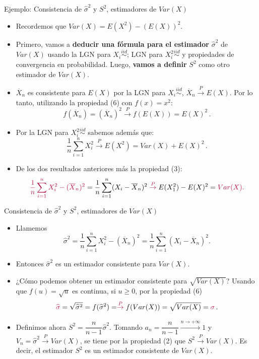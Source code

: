 \documentclass{beamer}
\theoremstyle{definition}
\newcommand{\cp}{\overset{P}{\rightarrow}}
\begin{document}
\begin{frame}{\color{rosee}Ejemplo: Consistencia de $\widehat{\sigma}^2$ y $S^2$, estimadores de $Var(X)$}\small
  
  \begin{itemize}
  \item  Recordemos que $Var(X)=E(X^{2})-\left( E(X)\right)^{2}$.
  \item Primero, vamos a \textbf{deducir una fórmula para el estimador} $\widehat{\sigma}^2$ de $Var(X)$ usando la LGN para $X_i\stackrel{iid}{\sim}$; LGN para $X_i^2\stackrel{iid}{\sim}$ y propiedades de convergencia en probabilidad. Luego,\textbf{ vamos a definir} $S^2$ como otro estimador de $Var(X)$.
    
\item $\overline{X}_n$ es consistente para $E(X)$ por la LGN para $X_i\stackrel{iid}{\sim}$, $\overline{X}_n \cp E(X)$. Por lo tanto, utilizando la propiedad (6) con $f(x)=x^2$:
    \[f(\overline{X}_n)=(\overline{X}_n)^{2} \cp f(E(X))=E(X)^{2}\,.\]
\item Por la LGN para $X_i^2\stackrel{iid}{\sim}$ sabemos además que:
    \[\frac{1}{n}\sum_{i=1}^n X_{i}^{2} \cp E(X^{2})=Var(X) + E(X)^2\,.\]
    \item De los dos resultados anteriores más la propiedad (3):
   \[ \color{rosee}\frac{1}{n}\sum_{i=1}^nX_{i}^{2} - (\overline{X}_n)^{2} \color{black}=\frac{1}{n}\sum_{i=1}^n(X_{i} - \overline{X}_n)^{2}  \color{rosee}\cp \color{black}E(X_{1}^{2}) - E(X)^2 =\color{rosee}Var(X).\]
  \end{itemize}
\end{frame}



\begin{frame}{\color{rosee}Consistencia de $\widehat{\sigma}^2$ y $S^2$, estimadores de $Var(X)$}\small
  \begin{itemize}
   \item Llamemos
    \[\widehat{\sigma}^{2} = \frac{1}{n}\sum_{i=1}^nX_{i}^{2} - (\overline{X}_n)^{2} = \frac{1}{n}\sum_{i=1}^n(X_{i} - \overline{X}_n)^{2}.\]
\item    Entonces $\widehat{\sigma}^{2}$ es un estimador consistente para $Var(X)$. \medskip 

\item ¿C\'omo podemos obtener un estimador consistente para $\sqrt{Var(X)}$?  Usando que $f(u)=\sqrt{u}$ es continua, si $u\geq 0$, por la propiedad (6) 
    \[\color{rosee}\widehat{\sigma} \color{black}= \sqrt{\widehat{\sigma}^{2}}=f(\widehat{\sigma}^{2})  =\color{rosee} \cp \color{black}f(Var(X))=\sqrt{Var(X)} = \color{rosee}\sigma\color{black}\,.\]

\item Definimos ahora $S^2=\dfrac{n}{n-1}\widehat{\sigma}^{2}$. Tomando $a_n=\dfrac{n}{n-1}\stackrel{n\to +\infty}{\longrightarrow}1$ y $V_n=\widehat{\sigma}^{2} \cp Var(X)$, se tiene por la propiedad (2) que $S^2\cp Var(X)$. Es decir, el estimador $S^2$ es un estimador consistente de $Var(X)$.
    \end{itemize}
\end{frame}
\end{document}
